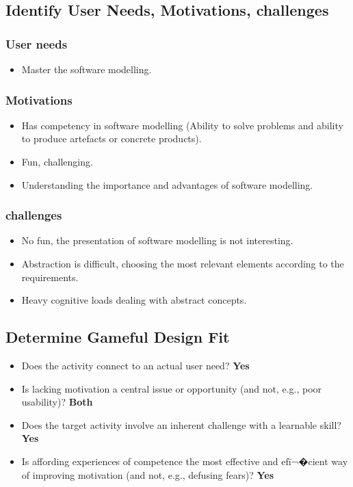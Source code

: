 \documentclass[12pt, a4paper]{report} \usepackage[titletoc]{appendix}
\begin{document}
\begin{appendices}
\subsection{Identify User Needs, Motivations, challenges}
\subsubsection{User needs}
\begin{itemize}
\item Master the software modelling.
\end{itemize}
\subsubsection{Motivations}
\begin{itemize}
\item Has competency in software modelling (Ability to solve problems and ability to produce artefacts or concrete products).
\item Fun, challenging.
\item Understanding the importance and advantages of software modelling.
\end{itemize}
\subsubsection{challenges}
\begin{itemize}
\item No fun, the presentation of software modelling is not interesting.
\item Abstraction is difficult, choosing the most relevant elements according to the requirements.
\item Heavy cognitive loads dealing with abstract concepts.
\end{itemize}

\subsection{Determine Gameful Design Fit}
\begin{itemize}
\item Does the activity connect to an actual user need? \textbf{Yes}
\item Is lacking motivation a central issue or opportunity (and not, e.g., poor usability)? \textbf{Both}
\item Does the target activity involve an inherent challenge with a learnable skill? \textbf{Yes}
\item Is affording experiences of competence the most effective and efï¬�cient way of improving motivation (and not, e.g., defusing fears)? \textbf{Yes}
\end{itemize}


\end{appendices}
\end{document}
